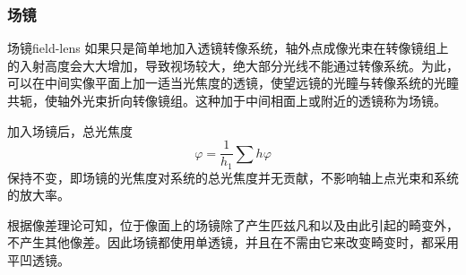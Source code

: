 \documentclass[cn,10pt,chinesefont=founder,math=mtpro2,cite=super,toc=onecol,twoside,openany]{elegantbook}
\begin{document}
\subsubsection{场镜}
\begin{definition}{场镜}{field-lens}
	如果只是简单地加入透镜转像系统，轴外点成像光束在转像镜组上的入射高度会大大增加，导致视场较大，绝大部分光线不能通过转像系统。为此，可以在中间实像平面上加一适当光焦度的透镜，使望远镜的光瞳与转像系统的光瞳共轭，使轴外光束折向转像镜组。这种加于中间相面上或附近的透镜称为场镜。
\end{definition}
加入场镜后，总光焦度
\begin{equation}
\varphi=\frac{1}{h_1}\sum h\varphi
\end{equation}
保持不变，即场镜的光焦度对系统的总光焦度并无贡献，不影响轴上点光束和系统的放大率。

根据像差理论可知，位于像面上的场镜除了产生匹兹凡和以及由此引起的畸变外，不产生其他像差。因此场镜都使用单透镜，并且在不需由它来改变畸变时，都采用平凹透镜。
\end{document}
